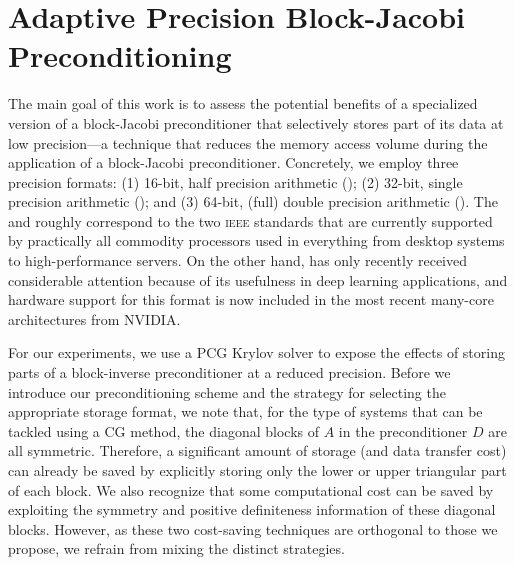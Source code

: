 \section{Adaptive Precision Block-Jacobi Preconditioning} \label{2017-adaptive-block-jacobi:sec:adaptive}
The main goal of this work is to assess the potential benefits of a specialized
version of a block-Jacobi preconditioner that selectively stores part of its
data at low precision---a technique that reduces the memory access volume 
during the
application of a block-Jacobi preconditioner. Concretely, we employ three
precision formats: (1) 16-bit, half precision arithmetic (\fph); 
(2) 32-bit, single precision arithmetic (\fps); and 
(3) 64-bit, (full) double precision arithmetic (\fpd).
The \fps and \fpd roughly correspond to the two \textsc{ieee}
standards that are currently supported by practically all commodity processors
used in everything from desktop systems to high-performance servers. 
On the other hand, \fph has only recently received considerable attention 
because of its usefulness in deep learning applications, and hardware support 
for
this format is now included in the most recent many-core architectures from 
NVIDIA.

For our experiments, we use a PCG Krylov solver to expose the
effects of storing parts of a block-inverse preconditioner at a reduced 
precision.
Before we introduce our preconditioning scheme and the strategy for selecting 
the
appropriate storage format, we note that, for the type of systems that can be
tackled using a CG method, the diagonal blocks of $A$ in the preconditioner $D$ 
are all
symmetric. Therefore, a significant amount of storage (and data transfer cost)
can already be saved by explicitly storing only the lower or upper triangular
part of each block. We also recognize that some computational cost can be saved
by exploiting the symmetry and positive definiteness information of these
diagonal blocks. However, 
as these two cost-saving techniques are orthogonal to those we propose, we 
refrain
from mixing the distinct strategies.

